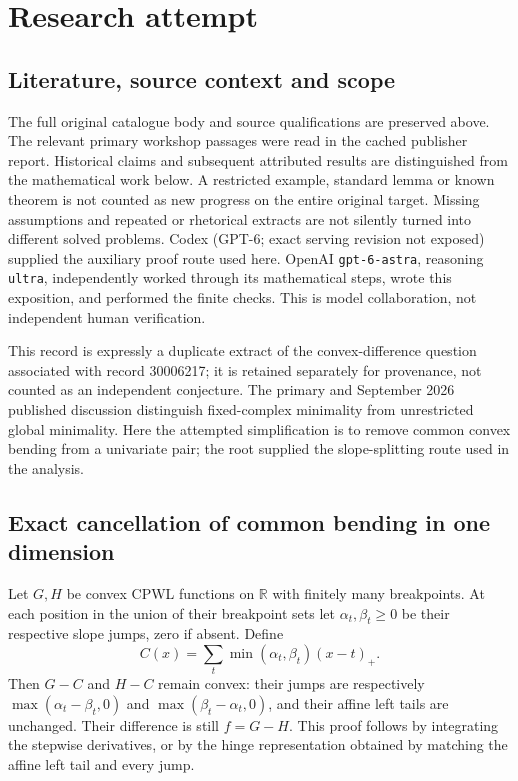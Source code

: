 \documentclass[11pt]{article}
\begin{document}
\section{Research attempt}
\subsection{Literature, source context and scope}
The full original catalogue body and source qualifications are preserved above. The relevant primary workshop passages were read in the cached publisher report. Historical claims and subsequent attributed results are distinguished from the mathematical work below. A restricted example, standard lemma or known theorem is not counted as new progress on the entire original target. Missing assumptions and repeated or rhetorical extracts are not silently turned into different solved problems.
Codex (GPT-6; exact serving revision not exposed) supplied the auxiliary proof route used here. OpenAI \texttt{gpt-6-astra}, reasoning \texttt{ultra}, independently worked through its mathematical steps, wrote this exposition, and performed the finite checks. This is model collaboration, not independent human verification.

This record is expressly a duplicate extract of the convex-difference question associated with record 30006217; it is retained separately for provenance, not counted as an independent conjecture. The primary and September 2026 published discussion distinguish fixed-complex minimality from unrestricted global minimality. Here the attempted simplification is to remove common convex bending from a univariate pair; the root supplied the slope-splitting route used in the analysis.
\subsection{Exact cancellation of common bending in one dimension}
Let $G,H$ be convex CPWL functions on $\mathbb R$ with finitely many breakpoints. At each position in the union of their breakpoint sets let $\alpha_t,\beta_t\ge0$ be their respective slope jumps, zero if absent. Define
\[
 C(x)=\sum_t\min(\alpha_t,\beta_t)(x-t)_+.
\]
Then $G-C$ and $H-C$ remain convex: their jumps are respectively $\max(\alpha_t-\beta_t,0)$ and $\max(\beta_t-\alpha_t,0)$, and their affine left tails are unchanged. Their difference is still $f=G-H$. This proof follows by integrating the stepwise derivatives, or by the hinge representation obtained by matching the affine left tail and every jump.
\end{document}

